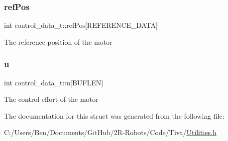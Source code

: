\subsubsection{\texorpdfstring{ref\+Pos}{refPos}}
{\footnotesize\ttfamily int control\+\_\+data\+\_\+t\+::ref\+Pos\mbox{[}R\+E\+F\+E\+R\+E\+N\+C\+E\+\_\+\+D\+A\+TA\mbox{]}}

The reference position of the motor \mbox{\label{structcontrol__data__t_a36f99e579c05c0ef5c77292d1b0ab65e}} 
\subsubsection{\texorpdfstring{u}{u}}
{\footnotesize\ttfamily int control\+\_\+data\+\_\+t\+::u\mbox{[}B\+U\+F\+L\+EN\mbox{]}}

The control effort of the motor 

The documentation for this struct was generated from the following file\+:\begin{DoxyCompactItemize}
\item 
C\+:/\+Users/\+Ben/\+Documents/\+Git\+Hub/2\+R-\/\+Robots/\+Code/\+Tiva/\mbox{\hyperlink{_utilities_8h}{Utilities.\+h}}\end{DoxyCompactItemize}
